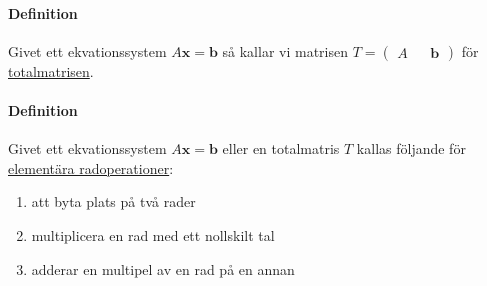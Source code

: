\paragraph{Definition} Givet ett ekvationssystem $A\bm{x}=\bm{b}$ så kallar vi matrisen $T=\begin{pmatrix}A&&\bm{b}\end{pmatrix}$ för \underline{totalmatrisen}.

\paragraph{Definition} Givet ett ekvationssystem $A\bm{x}=\bm{b}$ eller en totalmatris $T$ kallas följande för \underline{elementära radoperationer}:
\begin{enumerate}
    \item att byta plats på två rader
    \item multiplicera en rad med ett nollskilt tal
    \item adderar en multipel av en rad på en annan
\end{enumerate}